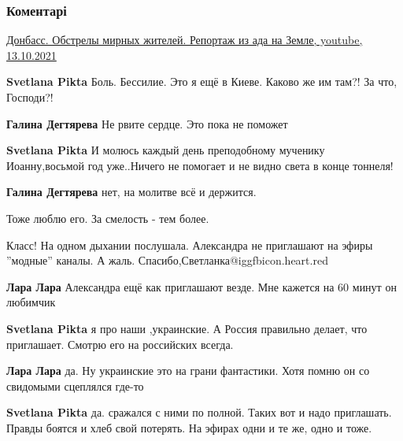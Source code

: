  
 
 
 
 
\subsubsection{Коментарі}

\begin{itemize} %
\href{https://youtu.be/9xwd2_rjclY}{%
Донбасс. Обстрелы мирных жителей. Репортаж из ада на Земле, youtube, 13.10.2021%
}

\begin{itemize} %
\textbf{Svetlana Pikta} Боль. Бессилие. Это я ещё в Киеве. Каково же им там?! За что, Господи?!

\textbf{Галина Дегтярева} Не рвите сердце. Это пока не поможет

\textbf{Svetlana Pikta} И молюсь каждый день преподобному мученику Иоанну,восьмой год уже..Ничего не помогает и не видно света в конце тоннеля!

\textbf{Галина Дегтярева} нет, на молитве всё и держится.
\end{itemize} %

Тоже люблю его. За смелость - тем более.

Класс! На одном дыхании послушала. Александра не приглашают на эфиры ''модные'' каналы. А жаль. Спасибо,Светланка@igg{fbicon.heart.red}

\begin{itemize} %
\textbf{Лара Лара} Александра ещё как приглашают везде. Мне кажется на 60 минут он любимчик

\textbf{Svetlana Pikta} я про наши ,украинские. А Россия правильно делает, что приглашает. Смотрю его на российских всегда.

\textbf{Лара Лара} да. Ну украинские это на грани фантастики. Хотя помню он со свидомыми сцеплялся где-то

\textbf{Svetlana Pikta} да. сражался с ними по полной. Таких вот и надо приглашать. Правды боятся и хлеб свой потерять. На эфирах одни и те же, одно и тоже.
\end{itemize} %


\end{itemize}
